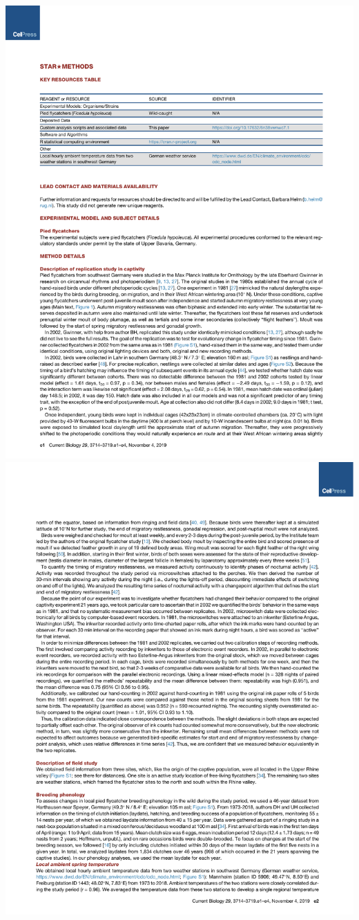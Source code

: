 \documentclass[a4paper, twoside]{templates/ociamthesis}
\begin{document}
\includegraphics[width=1\linewidth]{pdf_chapters/pied/pied_crop_Part07}
\includegraphics[width=1\linewidth]{pdf_chapters/pied/pied_crop_Part08}
\end{document}
